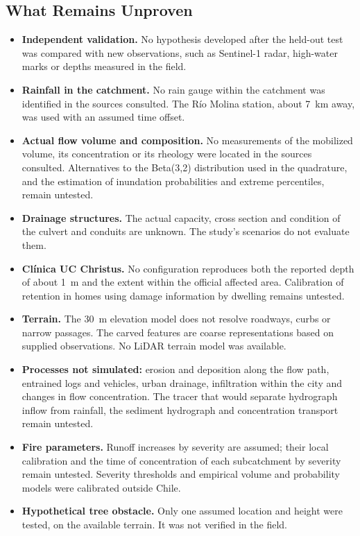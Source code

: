 \subsection*{What Remains Unproven}
\begin{itemize}
\item \textbf{Independent validation.} No hypothesis developed after the held-out test was compared with new observations, such as Sentinel-1 radar, high-water marks or depths measured in the field.
\item \textbf{Rainfall in the catchment.} No rain gauge within the catchment was identified in the sources consulted. The Río Molina station, about \SI{7}{km} away, was used with an assumed time offset.
\item \textbf{Actual flow volume and composition.} No measurements of the mobilized volume, its concentration or its rheology were located in the sources consulted. Alternatives to the Beta(3,2) distribution used in the quadrature, and the estimation of inundation probabilities and extreme percentiles, remain untested.
\item \textbf{Drainage structures.} The actual capacity, cross section and condition of the culvert and conduits are unknown. The study's scenarios do not evaluate them.
\item \textbf{Clínica UC Christus.} No configuration reproduces both the reported depth of about \SI{1}{m} \citep{cadena3_2026} and the extent within the official affected area. Calibration of retention in homes using damage information by dwelling remains untested.
\item \textbf{Terrain.} The \SI{30}{m} elevation model does not resolve roadways, curbs or narrow passages. The carved features are coarse representations based on supplied observations. No LiDAR terrain model was available.
\item \textbf{Processes not simulated:} erosion and deposition along the flow path, entrained logs and vehicles, urban drainage, infiltration within the city and changes in flow concentration. The tracer that would separate hydrograph inflow from rainfall, the sediment hydrograph and concentration transport remain untested.
\item \textbf{Fire parameters.} Runoff increases by severity are assumed; their local calibration and the time of concentration of each subcatchment by severity remain untested. Severity thresholds and empirical volume and probability models were calibrated outside Chile.
\item \textbf{Hypothetical tree obstacle.} Only one assumed location and height were tested, on the available terrain. It was not verified in the field.
\end{itemize}

